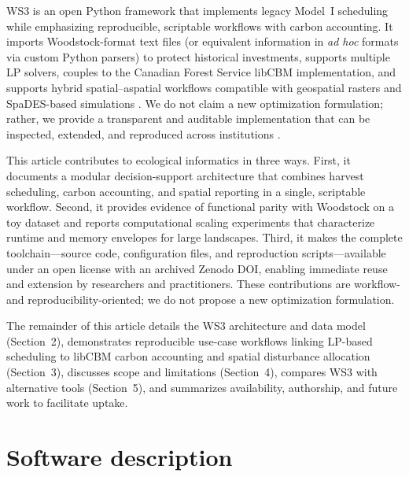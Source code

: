\documentclass[review]{elsarticle}
\begin{document}
WS3 is an open Python framework that implements legacy Model~I scheduling while emphasizing reproducible, scriptable workflows with carbon accounting. It imports Woodstock-format text files (or equivalent information in \emph{ad hoc} formats via custom Python parsers) to protect historical investments, supports multiple LP solvers, couples to the Canadian Forest Service libCBM implementation, and supports hybrid spatial--aspatial workflows compatible with geospatial rasters and SpaDES-based simulations \citep{remsoft-woodstock, pulp, highs, gurobi, kurz2009cbm, libcbm_py, spades}. We do not claim a new optimization formulation; rather, we provide a transparent and auditable implementation that can be inspected, extended, and reproduced across institutions \citep{hampton2015tao, lowndes2017path}.

This article contributes to ecological informatics in three ways. First, it documents a modular decision-support architecture that combines harvest scheduling, carbon accounting, and spatial reporting in a single, scriptable workflow. Second, it provides evidence of functional parity with Woodstock on a toy dataset and reports computational scaling experiments that characterize runtime and memory envelopes for large landscapes. Third, it makes the complete toolchain—source code, configuration files, and reproduction scripts—available under an open license with an archived Zenodo DOI, enabling immediate reuse and extension by researchers and practitioners. These contributions are workflow- and reproducibility-oriented; we do not propose a new optimization formulation.

The remainder of this article details the WS3 architecture and data model (Section~2), demonstrates reproducible use-case workflows linking LP-based scheduling to libCBM carbon accounting and spatial disturbance allocation (Section~3), discusses scope and limitations (Section~4), compares WS3 with alternative tools (Section~5), and summarizes availability, authorship, and future work to facilitate uptake.

\section{Software description}
\end{document}
